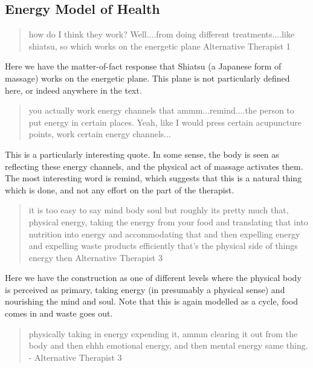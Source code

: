 \subsection{Energy Model of Health}
\label{sec:energy-model-health}

\begin{quotation}
  how do I think they work? Well....from doing different treatments....like shiatsu, so which works on the energetic plane
Alternative Therapist 1
\end{quotation}


Here we have the matter-of-fact response that Shiatsu (a Japanese form of massage) works on the energetic plane. This plane is not particularly defined here, or indeed anywhere in the text. 


\begin{quotation}
   you actually work energy channels that ammm...remind....the person to put energy in certain places. Yeah, like I would press certain acupuncture points, work certain energy channels...

\end{quotation}

This is a particularly interesting quote. In some sense, the body is seen as reflecting these energy channels, and the physical act of massage activates them. The most interesting word is remind, which suggests that this is a natural thing which is done, and not any effort on the part of the therapist. 

\begin{quotation}
  it is too easy to say mind body soul but roughly its pretty much that, physical energy, taking the energy from your food and translating that into nutrition into energy and accommodating that and then expelling energy and expelling waste products efficiently that's the physical side of things energy then 
Alternative Therapist 3
\end{quotation}

Here we have the construction as one of different levels  where the physical body is perceived as primary, taking energy (in presumably a physical sense) and nourishing the mind and soul. Note that this is again modelled as a cycle, food comes in and waste goes out. 

\begin{quotation}
  physically taking in energy expending it, ammm clearing it out from the body and then ehhh emotional energy, and then mental energy same thing.
- Alternative Therapist 3
\end{quotation}

